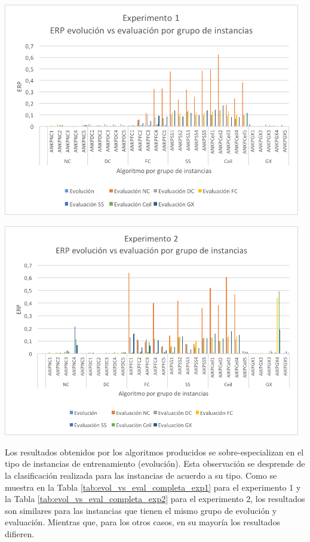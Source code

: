 \begingroup
    \centering
    \includegraphics[width=13cm]{images/cap6/evol_vs_eval_exp1.png}
    \label{fig:evol_vs_eval_exp1}
\endgroup

\begingroup
    \centering
    \includegraphics[width=13cm]{images/cap6/evol_vs_eval_exp2.png}
    \label{fig:evol_vs_eval_exp2}
\endgroup

Los resultados obtenidos por los algoritmos producidos se sobre-especializan en el tipo de instancias de entrenamiento (evolución). Esta observación se desprende de la clasificación realizada para las instancias de acuerdo a su tipo. Como se muestra en la Tabla \ref{tab:evol_vs_eval_completa_exp1} para el experimento 1 y la Tabla \ref{tab:evol_vs_eval_completa_exp2} para el experimento 2, los resultados son similares para las instancias que tienen el mismo grupo de evolución y evaluación. Mientras que, para los otros casos, en su mayoría los resultados difieren.


